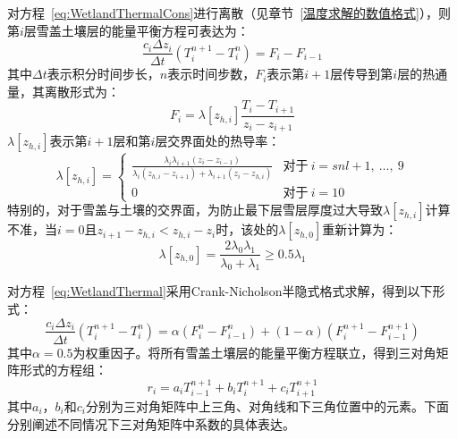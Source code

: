 对方程~\eqref{eq:WetlandThermalCons}进行离散（见章节~\ref{温度求解的数值格式}），则第$i$层雪盖土壤层的能量平衡方程可表达为：
\begin{equation}\label{eq:WetlandThermal}
    \frac{c_i \Delta z_i}{\Delta t} \left(T^{n+1}_i - T^n_i\right) = F_i - F_{i-1}
\end{equation}
其中$\Delta t$表示积分时间步长，$n$表示时间步数，$F_i$表示第$i+1$层传导到第$i$层的热通量，其离散形式为：
\begin{equation}
    F_i = \lambda \left[z_{h,i}\right] \frac{T_i-T_{i+1}}{z_i-z_{i+1}}
\end{equation}
$\lambda\left[z_{h,i}\right]$表示第$i+1$层和第$i$层交界面处的热导率：
\begin{equation}
    \lambda \left[z_{h,i}\right] = \begin{cases}
        \frac{\lambda_i\lambda_{i+1}\left(z_i-z_{i-1}\right)}{\lambda_i\left(z_{h,i}-z_{i+1}\right)+\lambda_{i+1}\left(z_i-z_{h,i}\right)}  &\text{对于}\ i=snl+1,\ \ldots,\ 9 \\
        0 &\text{对于}\ i=10
    \end{cases}
\end{equation}
特别的，对于雪盖与土壤的交界面，为防止最下层雪层厚度过大导致$\lambda\left[z_{h,i}\right]$计算不准，当$i=0$且$z_{i+1}-z_{h,i}<z_{h,i}-z_i$时，该处的$\lambda\left[z_{h,0}\right]$重新计算为：
\begin{equation}
    \lambda\left[z_{h,0}\right]=\frac{2\lambda_0\lambda_1}{\lambda_0+\lambda_1} \geqslant 0.5\lambda_1
\end{equation}

对方程~\eqref{eq:WetlandThermal}采用Crank-Nicholson半隐式格式求解，得到以下形式：
\begin{equation}
    \frac{c_i\Delta z_i}{\Delta t}\left(T^{n+1}_i - T^n_i\right)=\alpha \left(F^n_i - F^n_{i-1}\right) + \left(1-\alpha \right) \left(F^{n+1}_i - F^{n+1}_{i-1}\right)
\end{equation}
其中$\alpha = 0.5$为权重因子。将所有雪盖土壤层的能量平衡方程联立，得到三对角矩阵形式的方程组：
\begin{equation}
    r_i = a_i T^{n+1}_{i-1} + b_i T^{n+1}_i + c_i T^{n+1}_{i+1}
\end{equation}
其中$a_i$，$b_i$和$c_i$分别为三对角矩阵中上三角、对角线和下三角位置中的元素。下面分别阐述不同情况下三对角矩阵中系数的具体表达。

